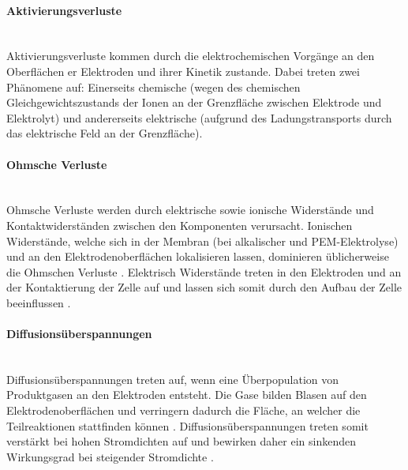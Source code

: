 \paragraph{Aktivierungsverluste} \ \\
Aktivierungsverluste kommen durch die elektrochemischen Vorgänge an den Oberflächen er Elektroden und ihrer Kinetik zustande. Dabei treten zwei Phänomene auf:  Einerseits chemische (wegen des chemischen Gleichgewichtszustands der Ionen an der Grenzfläche zwischen Elektrode und Elektrolyt) und andererseits elektrische (aufgrund des Ladungstransports durch das elektrische Feld an der Grenzfläche)\citep{stempien_solid_2013}.\\

\paragraph{Ohmsche Verluste} \ \\
Ohmsche Verluste werden durch elektrische sowie ionische Widerstände und Kontaktwiderständen zwischen den Komponenten verursacht. Ionischen Widerstände, welche sich in der Membran (bei alkalischer und PEM-Elektrolyse) und an den Elektrodenoberflächen lokalisieren lassen, dominieren üblicherweise die Ohmschen Verluste \cite{stempien_solid_2013}. Elektrisch Widerstände treten in den Elektroden und an der Kontaktierung der Zelle auf und lassen sich somit durch den Aufbau der Zelle beeinflussen \citep{tjarks_pem-elektrolyse-systeme_2017}.\\

\paragraph{Diffusionsüberspannungen}\ \\
Diffusionsüberspannungen treten auf, wenn eine Überpopulation von Produktgasen an den Elektroden entsteht. Die Gase bilden Blasen auf den Elektrodenoberflächen und verringern dadurch die Fläche, an welcher die Teilreaktionen stattfinden können \citep{abdin_modelling_2015}. Diffusionsüberspannungen treten somit verstärkt bei hohen Stromdichten auf und bewirken daher ein sinkenden Wirkungsgrad bei steigender Stromdichte \citep{biaku_semiempirical_2008}.\\

